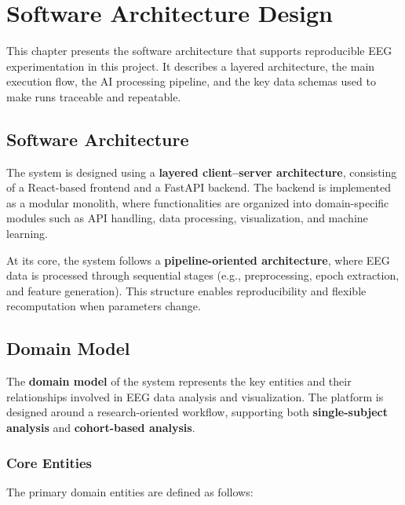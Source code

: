 \chapter{Software Architecture Design}
\label{ch:software-architecture-design}

\noindent
This chapter presents the software architecture that supports reproducible EEG experimentation in this project. It describes a layered architecture, the main execution flow, the AI processing pipeline, and the key data schemas used to make runs traceable and repeatable.
\vspace{1em}

\section{Software Architecture}
\label{sec:software-architecture}

The system is designed using a \textbf{layered client–server architecture}, consisting of a React-based frontend and a FastAPI backend. The backend is implemented as a modular monolith, where functionalities are organized into domain-specific modules such as API handling, data processing, visualization, and machine learning.
\vspace{0.5em}

At its core, the system follows a \textbf{pipeline-oriented architecture}, where EEG data is processed through sequential stages (e.g., preprocessing, epoch extraction, and feature generation). This structure enables reproducibility and flexible recomputation when parameters change.

\section{Domain Model}
\label{sec:domain-model}

The \textbf{domain model} of the system represents the key entities and their relationships involved in EEG data analysis and visualization. The platform is designed around a research-oriented workflow, supporting both \textbf{single-subject analysis} and \textbf{cohort-based analysis}.

\subsection*{Core Entities}
The primary domain entities are defined as follows:


